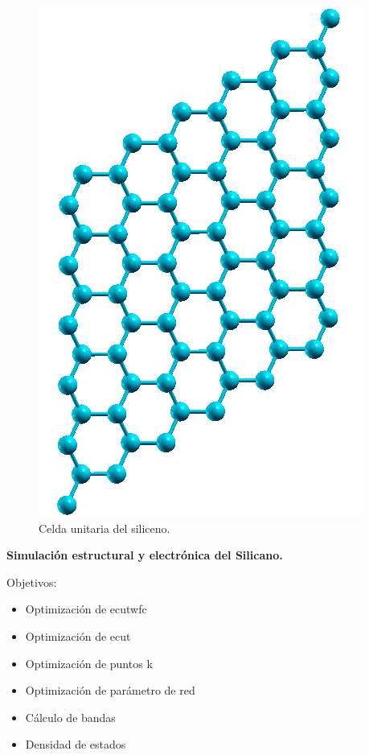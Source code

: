 \begin{frame}
    \begin{figure}[H]
        \centering
        \includegraphics[scale=0.3]{images_siliceno/siliceno_2d.png}
        \caption{Celda unitaria del siliceno.}
    \end{figure}
\end{frame}

\begin{frame}
    \textbf{Simulación estructural y electrónica del Silicano.}

    \vspace{0.4cm}

    Objetivos:

    \begin{itemize}
        \item Optimización de ecutwfc
        \item Optimización de ecut
        \item Optimización de puntos k
        \item Optimización de parámetro de red
        \item Cálculo de bandas
        \item Densidad de estados
    \end{itemize}
\end{frame}

